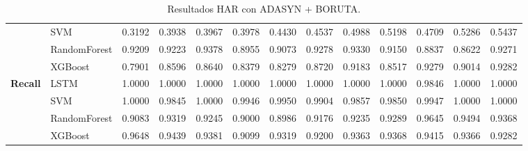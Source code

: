 \begin{table}[h]
\begin{adjustbox}{max width=15cm}
\begin{tabular}{|c|l|r|r|r|r|r|r|r|r|r|r|r|}
			& SVM &  0.3192 &  0.3938 &  0.3967 &  0.3978 &  0.4430 &  0.4537 &  0.4988 &  0.5198 &  0.4709 &  0.5286 &  0.5437 \\
			& RandomForest &  0.9209 &  0.9223 &  0.9378 &  0.8955 &  0.9073 &  0.9278 &  0.9330 &  0.9150 &  0.8837 &  0.8622 &  0.9271 \\
			& XGBoost &  0.7901 &  0.8596 &  0.8640 &  0.8379 &  0.8279 &  0.8720 &  0.9183 &  0.8517 &  0.9279 &  0.9014 &  0.9282 \\
			\hline
			\textbf{Recall} & LSTM &  1.0000 &  1.0000 &  1.0000 &  1.0000 &  1.0000 &  1.0000 &  1.0000 &  1.0000 &  0.9846 &  1.0000 &  1.0000 \\
			& SVM &  1.0000 &  0.9845 &  1.0000 &  0.9946 &  0.9950 &  0.9904 &  0.9857 &  0.9850 &  0.9947 &  1.0000 &  1.0000 \\
			& RandomForest &  0.9083 &  0.9319 &  0.9245 &  0.9000 &  0.8986 &  0.9176 &  0.9235 &  0.9289 &  0.9645 &  0.9494 &  0.9368 \\
			& XGBoost &  0.9648 &  0.9439 &  0.9381 &  0.9099 &  0.9319 &  0.9200 &  0.9363 &  0.9368 &  0.9415 &  0.9366 &  0.9282 \\
			\hline
		\end{tabular}
	\end{adjustbox}
	\caption{Resultados HAR con ADASYN + BORUTA.}
	\label{tab:HAR_ADASYN_BORUTA}
\end{table}
\newpage
